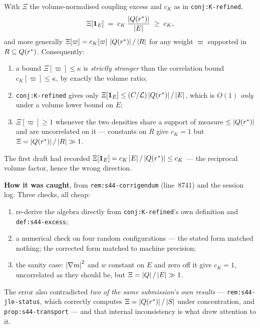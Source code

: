 \begin{statement}
\label{st:xi-vs-ck}
With \(\Xi\) the volume-normalised coupling excess and \(c_K\) as in
\texttt{conj:K-refined},
\[
  \Xi[\mathbf 1_E] \;=\; c_K\,\frac{\left|Q(r^{*})\right|}{\left|E\right|} \;\ge\; c_K ,
\]
and more generally \(\Xi[\varpi]=c_K[\varpi]\,\left|Q(r^{*})\right|/\left|R\right|\) for any
weight \(\varpi\) supported in \(R\subseteq Q(r^{*})\). Consequently:
\begin{enumerate}[label=(\roman*),leftmargin=2.4em]
\item a bound \(\Xi[\varpi]\le\kappa\) is \emph{strictly stronger} than the
  correlation bound \(c_K[\varpi]\le\kappa\), by exactly the volume ratio;
\item \texttt{conj:K-refined} gives only
  \(\Xi[\mathbf 1_E]\le(C/\mathcal{L})\left|Q(r^{*})\right|/\left|E\right|\), which is \(O(1)\)
  \emph{only} under a volume lower bound on \(E\);
\item \(\Xi[\varpi]\ge1\) whenever the two densities share a support of measure
  \(\le\left|Q(r^{*})\right|\) and are uncorrelated on it --- constants on \(R\) give
  \(c_K=1\) but \(\Xi=\left|Q(r^{*})\right|/\left|R\right|\gg1\).
\end{enumerate}
\end{statement}

The first draft had recorded \(\Xi[\mathbf 1_E]=c_K\left|E\right|/\left|Q(r^{*})\right|\le c_K\)
--- the reciprocal volume factor, hence the wrong direction.

\begin{record}
\textbf{How it was caught}, from \texttt{rem:s44-corrigendum} (line~8741) and
the session log. Three checks, all cheap:
\begin{enumerate}[label=(\roman*),leftmargin=2.4em]
\item re-derive the algebra directly from \texttt{conj:K-refined}'s own
  definition and \texttt{def:s44-excess};
\item a numerical check on four random configurations --- the stated form
  matched nothing; the corrected form matched to machine precision;
\item the sanity case: \(\left|\nabla m\right|^2\) and \(w\) constant on \(E\) and
  zero off it give \(c_K=1\), uncorrelated as they should be, but
  \(\Xi=\left|Q\right|/\left|E\right|\gg1\).
\end{enumerate}
The error also contradicted \emph{two of the same submission's own results}
--- \texttt{rem:s44-jle-status}, which correctly computes
\(\Xi=\left|Q(r^{*})\right|/\left|S\right|\) under concentration, and
\texttt{prop:s44-transport} --- and that internal inconsistency is what drew
attention to it.
\end{record}

